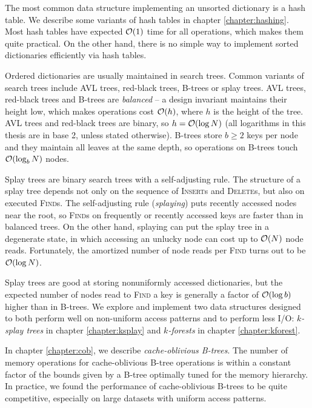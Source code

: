 The most common data structure implementing an unsorted dictionary is a hash
table. We describe some variants of hash tables in chapter \ref{chapter:hashing}.
Most hash tables have expected $\mathcal{O}(1)$ time for all operations, which
makes them quite practical. On the other hand, there is no simple way to
implement sorted dictionaries efficiently via hash tables.

Ordered dictionaries are usually maintained in search trees. Common variants
of search trees include AVL trees, red-black trees, B-trees or splay trees.
AVL trees, red-black trees and B-trees are \emph{balanced} -- a design
invariant maintains their height low, which makes operations cost $\mathcal{O}(h)$, where
$h$ is the height of the tree. AVL trees and red-black trees are binary,
so $h=\mathcal{O}(\log N)$ (all logarithms in this thesis are in base 2, unless stated
otherwise). B-trees store $b\geq 2$ keys per node and they maintain all leaves
at the same depth, so operations on B-trees touch $\mathcal{O}(\log_b N)$ nodes.

Splay trees are binary search trees with a self-adjusting rule.
The structure of a splay tree depends not only on the sequence of
\textsc{Insert}s and \textsc{Delete}s, but also on executed \textsc{Find}s.
The self-adjusting rule (\emph{splaying}) puts recently accessed nodes
near the root, so \textsc{Find}s on frequently or recently accessed keys
are faster than in balanced trees. On the other hand, splaying can put
the splay tree in a degenerate state, in which accessing an unlucky node can
cost up to $\mathcal{O}(N)$ node reads. Fortunately, the amortized number of node
reads per \textsc{Find} turns out to be $\mathcal{O}(\log N)$.

Splay trees are good at storing nonuniformly accessed dictionaries, but
the expected number of nodes read to \textsc{Find} a key is generally a factor
of $\mathcal{O}(\log b)$ higher than in B-trees. We explore and implement two
data structures designed to both perform well on non-uniform access patterns
and to perform less I/O: \emph{$k$-splay trees} in chapter
\ref{chapter:ksplay} and \emph{$k$-forests} in chapter \ref{chapter:kforest}.

In chapter \ref{chapter:cob}, we describe \emph{cache-oblivious B-trees}.
The number of memory operations for cache-oblivious B-tree operations
is within a constant factor of the bounds given by a B-tree optimally tuned
for the memory hierarchy. In practice, we found the performance of
cache-oblivious B-trees to be quite competitive, especially on large datasets
with uniform access patterns.

